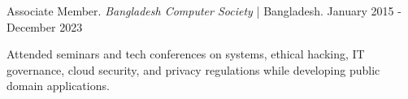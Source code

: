 
\begin{cventries2}


  \cventrynew
    {Associate Member. \textnormal{\textit{Bangladesh Computer Society} | Bangladesh.}} %
    {January 2015 - December 2023} %
    {
      \begin{cvitems} %
        \item {Attended seminars and tech conferences on systems, ethical hacking, IT governance, cloud security, and privacy regulations while developing public domain applications.}
      \end{cvitems}
      }

\end{cventries2}
